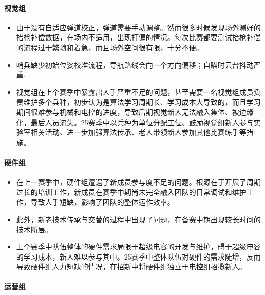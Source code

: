     \paragraph{视觉组}


        \begin{itemize}
            \item 由于没有自适应弹道校正，弹道需要手动调整。然而很多时候发现场外测好的抬枪补偿数据，在场内不适用，出现打偏的情况。每次比赛都要测试抬枪补偿的流程过于繁琐和着急，而且场外空间很有限，十分不便。
            \item 哨兵缺少初始位姿校准流程，导航路线会向一个方向偏移；自瞄时云台抖动严重.
            \item 视觉组在上个赛季中暴露出人手严重不足的问题，甚至需要一名视觉组成员负责维护多个兵种，初步认为是算法学习周期长、学习成本大导致的，而且学习期间很难参与机械和电控的进度，导致后期视觉新人无法融入集体、被边缘化，最后人员流失。25赛季中以兵种为单位分配工位、鼓励视觉组新人参与实验室相关活动、进一步加强算法传承、老人带领新人参加其他比赛练手等措施。
        \end{itemize}

    \paragraph{硬件组}


        \begin{itemize}
            \item 在上一赛季中，硬件组遭遇了新成员参与度不足的问题。根源在于开展了周期过长的培训工作，新成员在赛季中期尚未完全融入团队的日常调试和维护工作，导致人手短缺，影响了团队的整体运作效率。
            \item 此外，新老技术传承与交替的过程中出现了问题，在备赛中期出现较长时间的技术断层。
            \item 上个赛季中队伍整体的硬件需求局限于超级电容的开发与维护，碍于超级电容的学习成本，新人难以参与其中。25赛季中整体队伍对硬件的需求陡增，反而导致硬件组人力短缺的情况，在招新中将硬件组独立于电控组招揽新人。
        \end{itemize}

    \paragraph{运营组}

